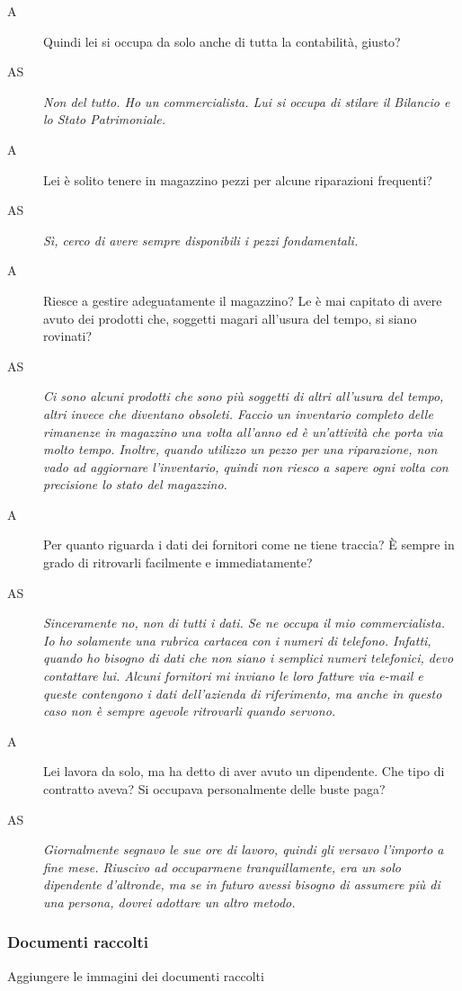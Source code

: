 \begin{description}
 			\item[A]
 				Quindi lei si occupa da solo anche di tutta la contabilità, giusto?
 			\item[AS]
 				\emph{Non del tutto. Ho un commercialista. Lui si occupa di stilare il Bilancio e lo Stato Patrimoniale.}
 			\item[A]
 				Lei è solito tenere in magazzino pezzi per alcune riparazioni frequenti?
 			\item[AS]
 				\emph{Sì, cerco di avere sempre disponibili i pezzi fondamentali.}
 			\item[A]
 				Riesce a gestire adeguatamente il magazzino? Le è mai capitato di avere avuto dei prodotti che, soggetti magari all'usura del tempo, si siano rovinati?
 			\item[AS]
 				\emph{Ci sono alcuni prodotti che sono più soggetti di altri all'usura del tempo, altri invece che diventano obsoleti. Faccio un inventario completo delle rimanenze in magazzino una volta all'anno ed è un'attività che porta via molto tempo. Inoltre, quando utilizzo un pezzo per una riparazione, non vado ad aggiornare l'inventario, quindi non riesco a sapere ogni volta con precisione lo stato del magazzino.}
 			\item[A]
 				Per quanto riguarda i dati dei fornitori come ne tiene traccia? È sempre in grado di ritrovarli facilmente e immediatamente?
 			\item[AS]
 				\emph{Sinceramente no, non di tutti i dati. Se ne occupa il mio commercialista. Io ho solamente una rubrica cartacea con i numeri di telefono. Infatti, quando ho bisogno di dati che non siano i semplici numeri telefonici, devo contattare lui. Alcuni fornitori mi inviano le loro fatture via e-mail e queste contengono i dati dell'azienda di riferimento, ma anche in questo caso non è sempre agevole ritrovarli quando servono.}
 			\item[A]
 				Lei lavora da solo, ma ha detto di aver avuto un dipendente. Che tipo di contratto aveva? Si occupava personalmente delle buste paga?
 			\item[AS]
 				\emph{Giornalmente segnavo le sue ore di lavoro, quindi gli versavo l'importo a fine mese. Riuscivo ad occuparmene tranquillamente, era un solo dipendente d'altronde, ma se in futuro avessi bisogno di assumere più di una persona, dovrei adottare un altro metodo.}
		\end{description}
				
		\subsubsection{Documenti raccolti}
			Aggiungere le immagini dei documenti raccolti
